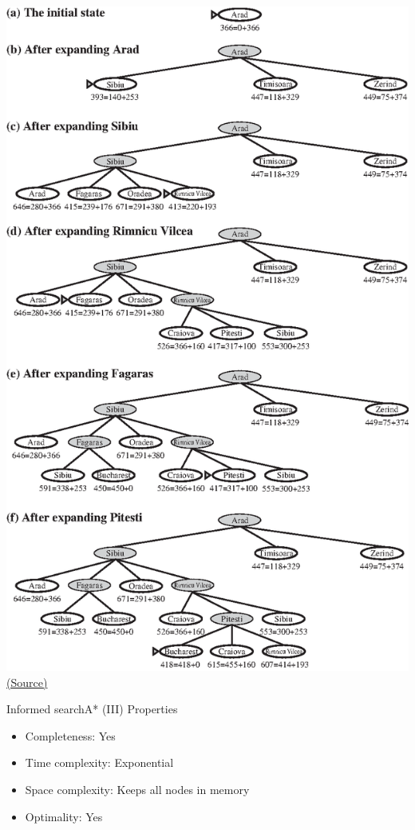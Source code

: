 \documentclass[10pt,compress]{beamer} %
\begin{document}
\begin{frame}
      \begin{center}
          \quad \includegraphics[width=\linewidth]{figs/astar-progress.eps}\\
          \tiny{\href{http://aima.cs.berkeley.edu/index.html}{(Source)}}
      \end{center}
\end{frame}

\begin{frame}{Informed search}{A* (III)}
      Properties
      \begin{itemize}
        \item Completeness: Yes
        \item Time complexity: Exponential
        \item Space complexity: Keeps all nodes in memory
        \item Optimality: Yes
      \end{itemize}
\end{frame}
\end{document}

